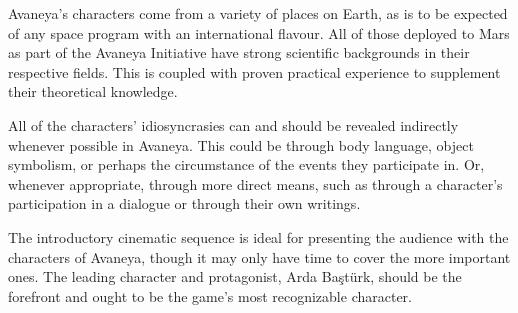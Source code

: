 

Avaneya's characters come from a variety of places on Earth, as is to be expected of any space program with an international flavour. All of those deployed to Mars as part of the Avaneya Initiative have strong scientific backgrounds in their respective fields. This is coupled with proven practical experience to supplement their theoretical knowledge.

All of the characters' idiosyncrasies can and should be revealed indirectly whenever possible in Avaneya. This could be through body language, object symbolism, or perhaps the circumstance of the events they participate in. Or, whenever appropriate, through more direct means, such as through a character's participation in a dialogue or through their own writings. 

The introductory cinematic sequence is ideal for presenting the audience with the characters of Avaneya, though it may only have time to cover the more important ones. The leading character and protagonist, Arda Baştürk, should be the forefront and ought to be the game's most recognizable character.


%
%

\StopChapter

